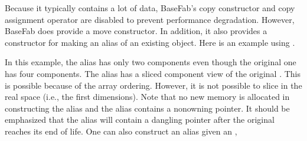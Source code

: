 \documentclass[letterpaper,10pt,english]{sphinxmanual}
\begin{document}
\sphinxAtStartPar
Because it typically contains a lot of data, BaseFab’s copy constructor and
copy assignment operator are disabled to prevent performance degradation. However, BaseFab does
provide a move constructor. In addition, it also provides a constructor for
making an alias of an existing object. Here is an example using
.

\begin{sphinxVerbatim}[commandchars=\\\{\}]
    
    
\end{sphinxVerbatim}

\sphinxAtStartPar
In this example, the alias  has only two components even though
the original one has four components. The alias has a sliced component view of
the original . This is possible because of the array ordering.
However, it is not possible to slice in the real space (i.e., the first
 dimensions).  Note that no new memory is allocated in
constructing the alias and the alias contains a non\sphinxhyphen{}owning pointer. It should
be emphasized that the alias will contain a dangling pointer after the original
 reaches its end of life.  One can also construct an
alias  given an ,

\begin{sphinxVerbatim}[commandchars=\\\{\}]
    
 
\end{sphinxVerbatim}
\end{document}
